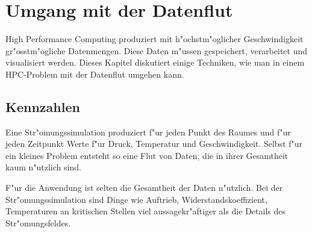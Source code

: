 \chapter{Umgang  mit der Datenflut}
High Performance Computing produziert mit h"ochstm"oglicher Geschwindigkeit
gr"osstm"ogliche Datenmengen. Diese Daten m"ussen gespeichert, verarbeitet
und visualisiert werden.
Dieses Kapitel diskutiert einige Techniken, wie man in einem HPC-Problem
mit der Datenflut umgehen kann.

\section{Kennzahlen\label{section-kennzahlen}}
Eine Str"omungssimulation produziert f"ur jeden Punkt des Raumes und
f"ur jeden Zeitpunkt Werte f"ur Druck, Temperatur und Geschwindigkeit.
Selbst f"ur ein kleines Problem entsteht so eine Flut von Daten, die
in ihrer Gesamtheit kaum n"utzlich sind. 

F"ur die Anwendung ist selten die Gesamtheit der Daten n"utzlich.
Bei der Str"omungssimulation sind Dinge wie Auftrieb, Widerstandskoeffizient,
Temperaturen an kritischen Stellen viel aussagekr"aftiger als die Details
des Str"omungsfeldes. 

